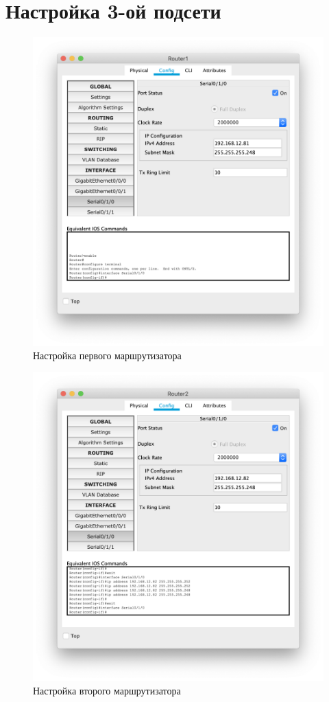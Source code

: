 \section{Настройка 3-ой подсети}%
\label{sec:3_net}
\begin{figure}[H]
    \centering
    \includegraphics[width=0.8\linewidth]{images/net_3_1.png}
    \caption{Настройка первого маршрутизатора}%
\end{figure}

\begin{figure}[H]
    \centering
    \includegraphics[width=0.8\linewidth]{images/net_3_2.png}
    \caption{Настройка второго маршрутизатора}%
\end{figure}

